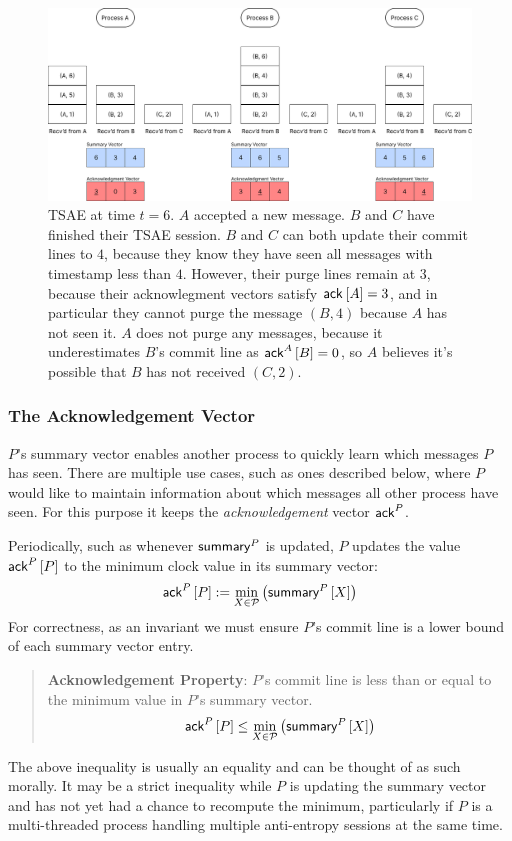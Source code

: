 \documentclass[]             %
{NASA}                       %
\theoremstyle{definition}
\begin{document}
\begin{landscape}
\begin{figure}[h]
    \label{fig:tsae5}
  \end{figure}
  \begin{figure}[h]
    \centering
    \includegraphics[width=1.4\textwidth]{images/tsae/TSAE6.png}
    \caption{TSAE at time $t=6$. $A$ accepted a new message. $B$ and $C$ have finished their TSAE session. $B$ and $C$ can both update their commit lines to $4$, because they know they have seen all messages with timestamp less than $4$. However, their purge lines remain at $3$, because their acknowlegment vectors satisfy $\textsf{ack}^{}\left[A\right] = 3$, and in particular they cannot purge the message $(B, 4)$ because $A$ has not seen it. $A$ does not purge any messages, because it underestimates $B$'s commit line as $\textsf{ack}^{A}\left[B\right] = 0$, so $A$ believes it's possible that $B$ has not received $(C, 2)$.}
    \label{fig:tsae6}
  \end{figure}
\end{landscape}

\subsubsection{The Acknowledgement Vector}
\label{sssec:tsae-acknowledgement}
$P$'s summary vector enables another process to quickly learn which
messages $P$ has seen. There are multiple use cases, such as ones
described below, where $P$ would like to maintain information about
which messages all other process have seen. For this purpose it keeps
the \emph{acknowledgement} vector $\textsf{ack}^{P}$.

Periodically, such as whenever $\textsf{summary}^{P}$ is updated, $P$
updates the value $\textsf{ack}^{P}\left[P\right]$ to the minimum clock value in its
summary vector:
\[\textsf{ack}^{P}\left[P\right] := \min_{X \in \mathcal{P}} \left(\textsf{summary}^{P}\left[X\right]\right)\]
For correctness, as an invariant we must ensure $P$'s commit line is a
lower bound of each summary vector entry.
\begin{quote}
  \textbf{Acknowledgement Property}: $P$'s commit line is less than or
  equal to the minimum value in $P$'s summary vector.
\[ \textsf{ack}^{P}\left[P\right] \leq \min_{X \in \mathcal{P}} \left(\textsf{summary}^{P}\left[X\right]\right)\]
\end{quote}
The above inequality is usually an equality and can be thought of as
such morally. It may be a strict inequality while $P$ is updating the
summary vector and has not yet had a chance to recompute the minimum,
particularly if $P$ is a multi-threaded process handling multiple
anti-entropy sessions at the same time.
\end{document}

